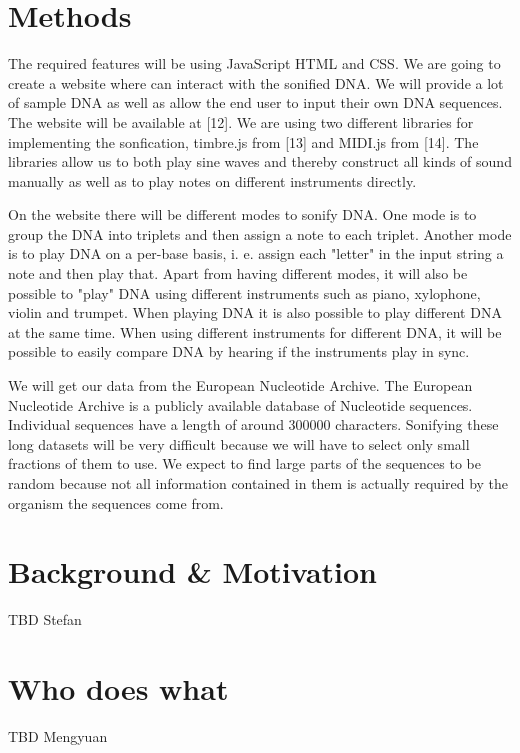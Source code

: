 \documentclass[12pt]{article}
\begin{document}
\section{Methods}

The required features will be using JavaScript HTML and CSS. We are going to create a website where can interact with the sonified DNA. We will provide a lot of sample DNA as well as allow the end user to input their own DNA sequences. The website will be available at [12]. We are using two different libraries for implementing the sonfication, timbre.js from [13] and MIDI.js from [14]. The libraries allow us to both play sine waves and thereby construct all kinds of sound manually as well as to play notes on different instruments directly. 

On the website there will be different modes to sonify DNA. One mode is to group the DNA into triplets and then assign a note to each triplet. Another mode is to play DNA on a per-base basis, i. e. assign each "letter" in the input string a note and then play that. Apart from having different modes, it will also be possible to "play" DNA using different instruments such as piano, xylophone, violin and trumpet. When playing DNA it is also possible to play different DNA at the same time. When using different instruments for different DNA, it will be possible to easily compare DNA by hearing if the instruments play in sync. 

We will get our data from the European Nucleotide Archive. The European Nucleotide Archive is a publicly available database of Nucleotide sequences. Individual sequences have a length of around 300000 characters. Sonifying these long datasets will be very difficult because we will have to select only small fractions of them to use. We expect to find large parts of the sequences to be random because not all information contained in them is actually required by the organism the sequences come from.  

\section{Background \& Motivation}

TBD Stefan

\section{Who does what}

TBD Mengyuan

\nocite{*}
\printbibliography
\end{document}
